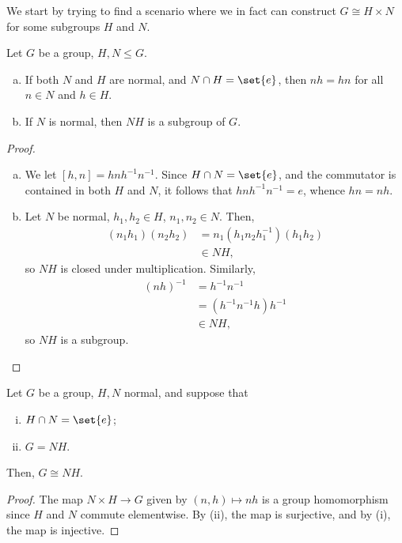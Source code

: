 \documentclass[10pt]{mypackage}
\begin{document}
We start by trying to find a scenario where we in fact can construct $G \cong H\times N$ for some subgroups $H$ and $N$.
\begin{lemma}
  Let $G$ be a group, $H,N\leq G$.
  \begin{enumerate}[(a)]
    \item If both $N$ and $H$ are normal, and $N\cap H = \set{e}$, then $nh = hn$ for all $n\in N$ and $h\in H$.
    \item If $N$ is normal, then $NH$ is a subgroup of $G$.
  \end{enumerate}
\end{lemma}
\begin{proof}\hfill
  \begin{enumerate}[(a)]
    \item We let $\left[ h,n \right] = hnh^{-1}n^{-1}$. Since $H\cap N = \set{e}$, and the commutator is contained in both $H$ and $N$, it follows that $hnh^{-1}n^{-1} = e$, whence $hn = nh$.
    \item Let $N$ be normal, $h_1,h_2\in H$, $n_1,n_2\in N$. Then,
      \begin{align*}
        \left( n_1h_1 \right)\left( n_2h_2 \right) &= n_1\left( h_1n_2h_1^{-1} \right)\left( h_1h_2 \right)\\
                                                   &\in NH,
      \end{align*}
      so $NH$ is closed under multiplication. Similarly,
      \begin{align*}
        \left( nh \right)^{-1} &= h^{-1}n^{-1}\\
                               &= \left( h^{-1}n^{-1}h \right)h^{-1}\\
                               &\in NH,
      \end{align*}
      so $NH$ is a subgroup.
  \end{enumerate}
\end{proof}
\begin{theorem}
  Let $G$ be a group, $H,N$ normal, and suppose that
  \begin{enumerate}[(i)]
    \item $H\cap N = \set{e}$;
    \item $G = NH$.
  \end{enumerate}
  Then, $G\cong NH$.
\end{theorem}
\begin{proof}
  The map $N\times H\rightarrow G$ given by $\left( n,h \right)\mapsto nh$ is a group homomorphism since $H$ and $N$ commute elementwise. By (ii), the map is surjective, and by (i), the map is injective.
\end{proof}
\end{document}
